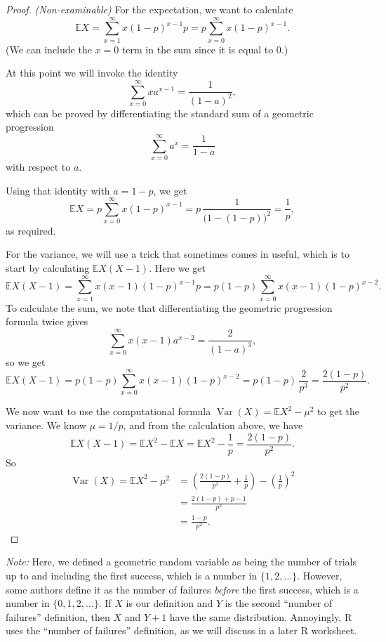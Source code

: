 \documentclass[
  a4paper,
]{book}
\theoremstyle{definition}
\theoremstyle{definition}
\theoremstyle{definition}
\theoremstyle{definition}
\theoremstyle{remark}
\begin{document}
\begin{proof}
\emph{(Non-examinable)}
For the expectation, we want to calculate
\[ \mathbb EX = \sum_{x=1}^\infty x (1-p)^{x-1} p = p \sum_{x=0}^\infty x (1-p)^{x-1}. \]
(We can include the \(x = 0\) term in the sum since it is equal to 0.)

At this point we will invoke the identity
\[ \sum_{x = 0}^\infty x a^{x-1} = \frac{1}{(1-a)^2} , \]
which can be proved by differentiating the standard sum of a geometric progression
\[ \sum_{x = 0}^\infty a^x = \frac{1}{1 - a} \]
with respect to \(a\).

Using that identity with \(a = 1-p\), we get
\[ \mathbb EX = p \sum_{x=0}^\infty x (1-p)^{x-1} = p\, \frac{1}{\big(1 - (1-p)\big)^2} = \frac{1}{p} , \]
as required.

For the variance, we will use a trick that sometimes comes in useful, which is to start by calculating \(\mathbb EX(X-1)\). Here we get
\[ \mathbb EX(X-1) = \sum_{x=1}^\infty x (x-1) (1-p)^{x-1} p = p(1-p) \sum_{x=0}^\infty x(x-1) (1-p)^{x-2} . \]
To calculate the sum, we note that differentiating the geometric progression formula twice gives
\[ \sum_{x = 0}^\infty x(x-1) a^{x-2} = \frac{2}{(1-a)^3} , \]
so we get
\[ \mathbb EX(X-1) = p(1-p) \sum_{x=0}^\infty x(x-1) (1-p)^{x-2} = p(1 -p) \, \frac{2}{p^3} = \frac{2(1-p)}{p^2} . \]

We now want to use the computational formula \(\operatorname{Var}(X) = \mathbb EX^2 - \mu^2\) to get the variance. We know \(\mu = 1/p\), and from the calculation above, we have
\[ \mathbb EX(X-1) = \mathbb EX^2 - \mathbb EX = \mathbb EX^2 - \frac{1}{p} = \frac{2(1-p)}{p^2} . \]
So
\begin{align*}
\operatorname{Var}(X) = \mathbb EX^2 - \mu^2
&= \left(\frac{2(1-p)}{p^2} + \frac{1}{p}\right) - \left(\frac{1}{p}\right)^2 \\
&= \frac{2(1-p) + p - 1}{p^2} \\
&= \frac{1-p}{p^2} .
\end{align*}
\end{proof}

\emph{Note:} Here, we defined a geometric random variable as being the number of trials up to and including the first success, which is a number in \(\{1, 2, \dots\}\). However, some authors define it as the number of failures \emph{before} the first success, which is a number in \(\{0, 1, 2,\dots\}\). If \(X\) is our definition and \(Y\) is the second ``number of failures'' definition, then \(X\) and \(Y+1\) have the same distribution. Annoyingly, R uses the ``number of failures'' definition, as we will discuss in a later R worksheet.
\end{document}
